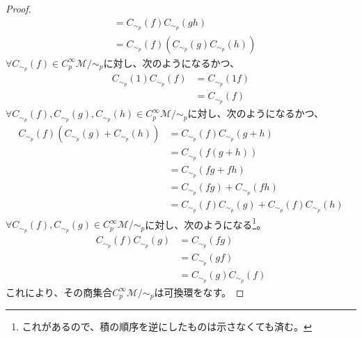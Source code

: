 \documentclass[dvipdfmx]{jsarticle}
\begin{document}
\begin{proof}
\begin{align*}
    &=C_{\sim_p}\left(f\right)C_{\sim_p}\left(gh\right)\\
    &=C_{\sim_p}\left(f\right)\left(C_{\sim_p}\left(g\right)C_{\sim_p}\left(h\right)\right)
  \end{align*}
  $\forall C_{\sim_p}\left(f\right)\in C^\infty_p \mathcal{M}/\sim_p$に対し、次のようになるかつ、
  \begin{align*}
    C_{\sim_p}\left(1\right)C_{\sim_p}\left(f\right)&=C_{\sim_p}\left(1f\right)\\
    &=C_{\sim_p}\left(f\right)
  \end{align*}
  $\forall C_{\sim_p}\left(f\right),C_{\sim_p}\left(g\right),C_{\sim_p}\left(h\right)\in C^\infty_p \mathcal{M}/\sim_p$に対し、次のようになるかつ、
  \begin{align*}
    C_{\sim_p}\left(f\right)\left(C_{\sim_p}\left(g\right)+C_{\sim_p}\left(h\right)\right)&=C_{\sim_p}\left(f\right)C_{\sim_p}\left(g+h\right)\\
    &=C_{\sim_p}\left(f\left(g+h\right)\right)\\
    &=C_{\sim_p}\left(fg+fh\right)\\
    &=C_{\sim_p}\left(fg\right)+C_{\sim_p}\left(fh\right)\\
    &=C_{\sim_p}\left(f\right)C_{\sim_p}\left(g\right)+C_{\sim_p}\left(f\right)C_{\sim_p}\left(h\right)
  \end{align*}
  $\forall C_{\sim_p}\left(f\right),C_{\sim_p}\left(g\right)\in C^\infty_p \mathcal{M}/\sim_p$に対し、次のようになる\footnote{これがあるので、積の順序を逆にしたものは示さなくても済む。}。
  \begin{align*}
    C_{\sim_p}\left(f\right)C_{\sim_p}\left(g\right)&=C_{\sim_p}\left(fg\right)\\
    &=C_{\sim_p}\left(gf\right)\\
    &=C_{\sim_p}\left(g\right)C_{\sim_p}\left(f\right)
  \end{align*}
  これにより、その商集合$C^\infty_p \mathcal{M}/\sim_p$は可換環をなす。
\end{proof}
\end{document}
